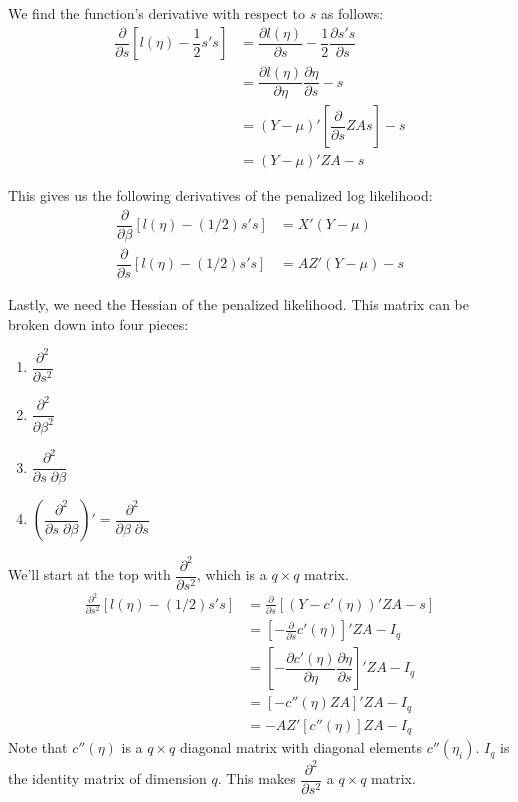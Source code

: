\documentclass{article}
\begin{document}
We find the function's derivative with respect to $s$ as follows:
\begin{align}
\dfrac{\partial }{\partial s} \left[ l(\eta) -\dfrac{1}{2} s's   \right] &= \dfrac{\partial l(\eta)}{\partial s} -\dfrac{1}{2} \dfrac{\partial s's}{\partial s}\\
&= \dfrac{\partial l(\eta)}{\partial \eta} \dfrac{\partial \eta}{\partial s} -s\\
&= (Y-\mu)' \left[ \dfrac{\partial}{\partial s} ZAs \right] -s\\
&=(Y-\mu)'ZA -s
\end{align}

This gives us the following derivatives of the penalized log likelihood:
\begin{align}
\dfrac{\partial}{\partial \beta} \left[ l(\eta)-(1/2)s's \right]&= X' (Y-\mu)\\
\dfrac{\partial}{\partial s} \left[ l(\eta)-(1/2)s's \right]&= AZ' (Y-\mu)  -s
\end{align}

Lastly, we need the Hessian of the penalized likelihood. This matrix can be broken down into four pieces: 
\begin{enumerate}
\item $ \dfrac{\partial^2}{\partial s^2}$
\item $ \dfrac{\partial^2}{\partial \beta^2}$
\item $\dfrac{\partial^2}{ \partial s \; \partial \beta}$
\item $\left(\dfrac{\partial^2}{ \partial s \; \partial \beta}\right) ' =\dfrac{\partial^2}{ \partial \beta \; \partial s}$
\end{enumerate}

We'll start at the top with  $ \dfrac{\partial^2}{\partial s^2}$, which is a $q \times q$ matrix.
\begin{align}
  \frac{\partial^2}{\partial s^2}  \left[ l(\eta) - (1/2) s's   \right] &=   \frac{\partial}{\partial s} \left[ (Y-c'(\eta))'ZA -s   \right]\\
&=\left[- \frac{\partial}{\partial s} c'(\eta)\right]'ZA - I_q \\
&= \left[-\dfrac{\partial c'(\eta)}{\partial \eta} \dfrac{\partial \eta}{\partial s}   \right] 'ZA - I_q \\
&= \left[ -c''(\eta) ZA  \right]'ZA - I_q \\
&= -AZ' \left[ c''(\eta) \right] ZA - I_q
\end{align}
Note that $c''(\eta)$ is a $q\times q$ diagonal matrix with diagonal elements $c''(\eta_i)$.  $I_q$ is the identity matrix of dimension $q$.  This makes  $ \dfrac{\partial^2}{\partial s^2}$ a $q \times q$ matrix.
\end{document}
